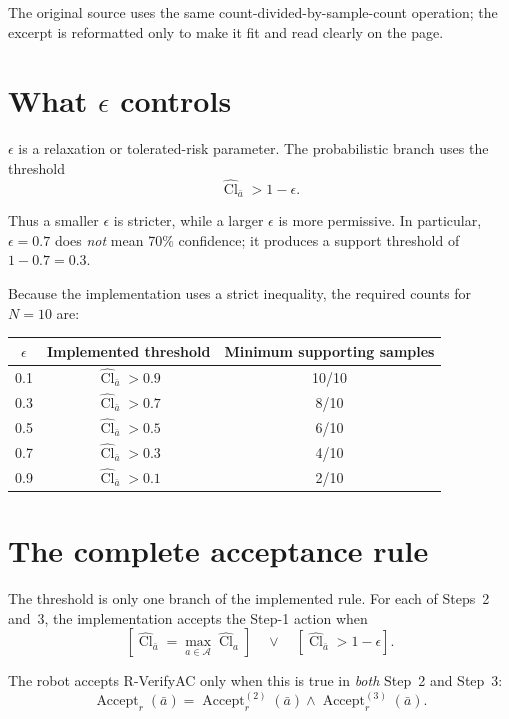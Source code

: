 \documentclass[11pt,a4paper]{article}
\newcommand{\Cl}{\operatorname{Cl}}
\begin{document}
The original source uses the same count-divided-by-sample-count operation; the
excerpt is reformatted only to make it fit and read clearly on the page.

\section{What $\epsilon$ controls}

$\epsilon$ is a relaxation or tolerated-risk parameter.  The probabilistic
branch uses the threshold
\[
    \widehat{\Cl}_{\bar a} > 1-\epsilon.
\]

Thus a smaller $\epsilon$ is stricter, while a larger $\epsilon$ is more
permissive.  In particular, $\epsilon=0.7$ does \emph{not} mean 70\% confidence;
it produces a support threshold of $1-0.7=0.3$.

Because the implementation uses a strict inequality, the required counts for
$N=10$ are:

\begin{center}
\begin{tabular}{ccc}
\toprule
$\epsilon$ & Implemented threshold & Minimum supporting samples \\
\midrule
0.1 & $\widehat{\Cl}_{\bar a}>0.9$ & 10/10 \\
0.3 & $\widehat{\Cl}_{\bar a}>0.7$ & 8/10 \\
0.5 & $\widehat{\Cl}_{\bar a}>0.5$ & 6/10 \\
0.7 & $\widehat{\Cl}_{\bar a}>0.3$ & 4/10 \\
0.9 & $\widehat{\Cl}_{\bar a}>0.1$ & 2/10 \\
\bottomrule
\end{tabular}
\end{center}

\section{The complete acceptance rule}

The threshold is only one branch of the implemented rule.  For each of
Steps~2 and~3, the implementation accepts the Step-1 action when
\[
    \left[
      \widehat{\Cl}_{\bar a}=\max_{a\in\mathcal A}\widehat{\Cl}_a
    \right]
    \quad\lor\quad
    \left[
      \widehat{\Cl}_{\bar a}>1-\epsilon
    \right].
\]

The robot accepts R-VerifyAC only when this is true in \emph{both} Step~2 and
Step~3:
\[
    \operatorname{Accept}_r(\bar a)
    = \operatorname{Accept}^{(2)}_r(\bar a)
      \land
      \operatorname{Accept}^{(3)}_r(\bar a).
\]
\end{document}

